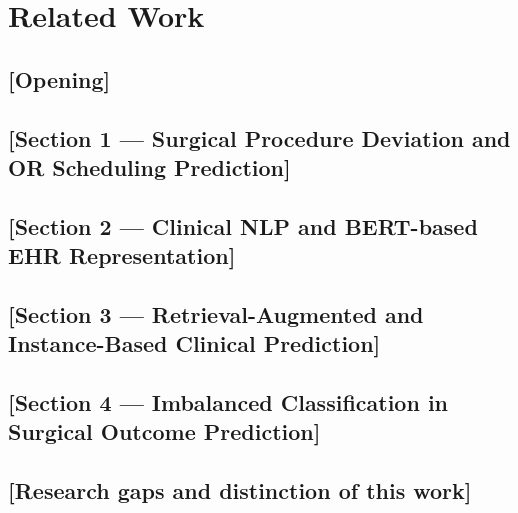
\section{Related Work}
\label{sec:related_work}

\subsection*{[Opening]}

\subsection*{[Section 1 — Surgical Procedure Deviation and OR Scheduling Prediction]}

\subsection*{[Section 2 — Clinical NLP and BERT-based EHR Representation]}

\subsection*{[Section 3 — Retrieval-Augmented and Instance-Based Clinical Prediction]}

\subsection*{[Section 4 — Imbalanced Classification in Surgical Outcome Prediction]}

\subsection*{[Research gaps and distinction of this work]}

